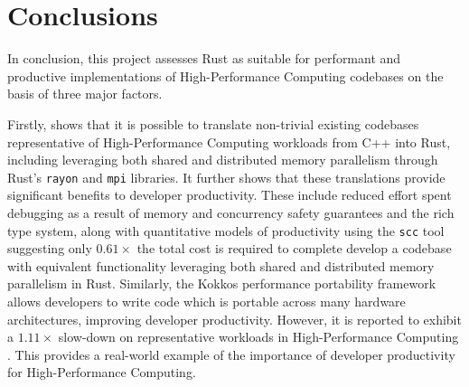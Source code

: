 \chapter{Conclusions}
\label{ch:conclusions}


In conclusion, this project assesses Rust as suitable for performant and productive implementations of High-Performance Computing codebases on the basis of three major factors.

Firstly,  shows that it is possible to translate non-trivial existing codebases representative of High-Performance Computing workloads from C++ into Rust, including leveraging both shared and distributed memory parallelism through Rust's \texttt{rayon} and \texttt{mpi} libraries. It further shows that these translations provide significant benefits to developer productivity. These include reduced effort spent debugging as a result of memory and concurrency safety guarantees and the rich type system, along with quantitative models of productivity using the \texttt{scc} tool suggesting only $0.61 \times$ the total cost is required to complete develop a codebase with equivalent functionality leveraging both shared and distributed memory parallelism in Rust.
Similarly, the Kokkos performance portability framework allows developers to write code which is portable across many hardware architectures, improving developer productivity. However, it is reported to exhibit a $1.11 \times$ slow-down on representative workloads in High-Performance Computing \cite{carteredwardsKokkosEnablingManycore2014}. This provides a real-world example of the importance of developer productivity for High-Performance Computing.

